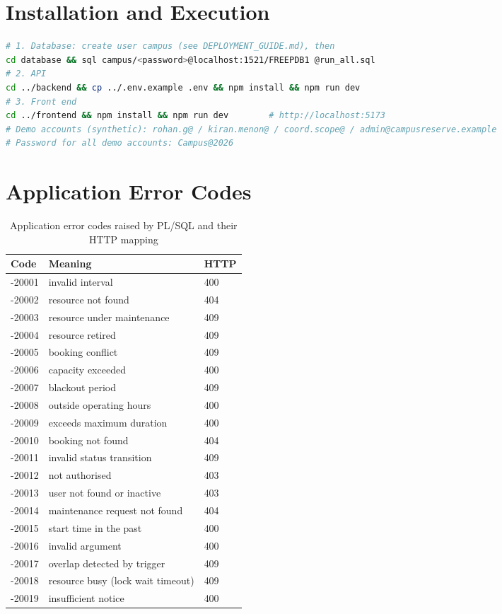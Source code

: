 \documentclass[12pt,a4paper,oneside]{report}
\renewcommand{\_}{\origus\allowbreak}
\begin{document}
\appendix
\chapter{Installation and Execution}
\begin{lstlisting}[language=bash,caption={Local installation}]
# 1. Database: create user campus (see DEPLOYMENT_GUIDE.md), then
cd database && sql campus/<password>@localhost:1521/FREEPDB1 @run_all.sql
# 2. API
cd ../backend && cp ../.env.example .env && npm install && npm run dev
# 3. Front end
cd ../frontend && npm install && npm run dev        # http://localhost:5173
# Demo accounts (synthetic): rohan.g@ / kiran.menon@ / coord.scope@ / admin@campusreserve.example
# Password for all demo accounts: Campus@2026
\end{lstlisting}

\chapter{Application Error Codes}
\begin{table}[H]\centering\small
\caption{Application error codes raised by PL/SQL and their HTTP mapping}\label{tab:errors}
\begin{tabular}{@{}lll@{}}\toprule
Code & Meaning & HTTP\\\midrule
-20001 & invalid interval & 400\\
-20002 & resource not found & 404\\
-20003 & resource under maintenance & 409\\
-20004 & resource retired & 409\\
-20005 & booking conflict & 409\\
-20006 & capacity exceeded & 400\\
-20007 & blackout period & 409\\
-20008 & outside operating hours & 400\\
-20009 & exceeds maximum duration & 400\\
-20010 & booking not found & 404\\
-20011 & invalid status transition & 409\\
-20012 & not authorised & 403\\
-20013 & user not found or inactive & 403\\
-20014 & maintenance request not found & 404\\
-20015 & start time in the past & 400\\
-20016 & invalid argument & 400\\
-20017 & overlap detected by trigger & 409\\
-20018 & resource busy (lock wait timeout) & 409\\
-20019 & insufficient notice & 400\\\bottomrule
\end{tabular}\end{table}
\end{document}
